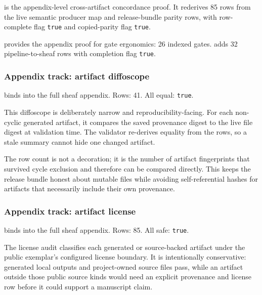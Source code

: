 \documentclass[
  english,
]{article}
\begin{document}
 is the appendix-level
cross-artifact concordance proof. It rederives 85 rows from the live
semantic producer map and release-bundle parity rows, with row-complete
flag \texttt{true} and copied-parity flag \texttt{true}.

 provides the appendix proof for
gate ergonomics: 26 indexed gates. 
adds 32 pipeline-to-sheaf rows with completion flag \texttt{true}.

\subsubsection{Appendix track: artifact
diffoscope}\label{appendix-track-artifact-diffoscope}

 binds
 into the full sheaf
appendix. Rows: 41. All equal: \texttt{true}.

This diffoscope is deliberately narrow and reproducibility-facing. For
each non-cyclic generated artifact, it compares the saved provenance
digest to the live file digest at validation time. The validator
re-derives equality from the rows, so a stale 
summary cannot hide one changed artifact.

The row count is not a decoration; it is the number of artifact
fingerprints that survived cycle exclusion and therefore can be compared
directly. This keeps the release bundle honest about mutable files while
avoiding self-referential hashes for artifacts that necessarily include
their own provenance.

\subsubsection{Appendix track: artifact
license}\label{appendix-track-artifact-license}

 binds
 into the full
sheaf appendix. Rows: 85. All safe: \texttt{true}.

The license audit classifies each generated or source-backed artifact
under the public exemplar's configured license boundary. It is
intentionally conservative: generated local outputs and project-owned
source files pass, while an artifact outside those public source kinds
would need an explicit provenance and license row before it could
support a manuscript claim.
\end{document}

